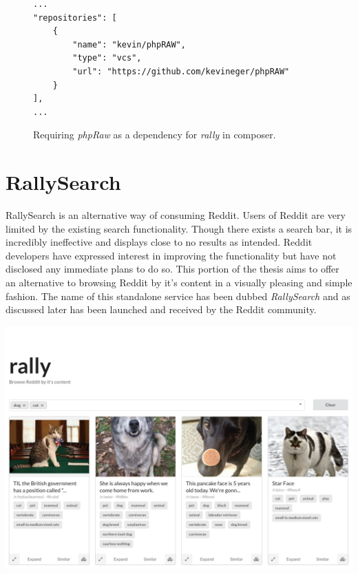 \documentclass[msc,oneside]{ubcthesis}%
\begin{document}
\begin{figure}[H]
\begin{lstlisting}
...
"repositories": [
	{
		"name": "kevin/phpRAW",
		"type": "vcs",
		"url": "https://github.com/kevineger/phpRAW"
	}
],
...
\end{lstlisting}
\caption[Requiring phpRaw as a dependency in composer.]{
Requiring \textit{phpRaw} as a dependency for \textit{rally} in composer.}
\label{fig:composer}
\end{figure}

\section{RallySearch}
RallySearch is an alternative way of consuming Reddit. Users of Reddit are very limited by the existing search functionality. Though there exists a search bar, it is incredibly ineffective and displays close to no results as intended. Reddit developers have expressed interest in improving the functionality but have not disclosed any immediate plans to do so. This portion of the thesis aims to offer an alternative to browsing Reddit by it's content in a visually pleasing and simple fashion. The name of this standalone service has been dubbed \textit{RallySearch} and as discussed later has been launched and received by the Reddit community.

\includegraphics[width=\textwidth]{rallysearch_screenshot.png}
\end{document}
